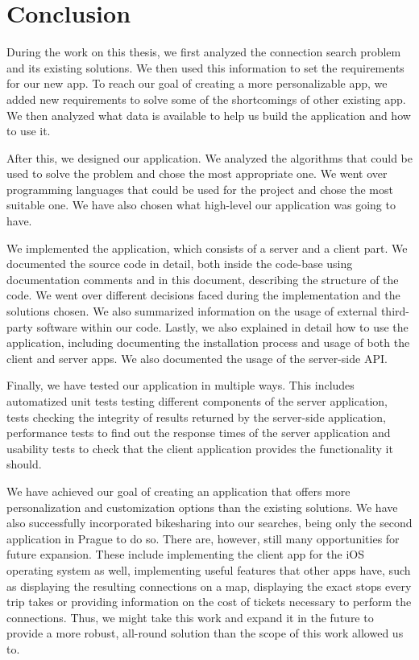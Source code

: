 \chapter*{Conclusion}

During the work on this thesis, we first analyzed the connection search problem and its existing solutions. We then used this information to set the requirements for our new app. To reach our goal of creating a more personalizable app, we added new requirements to solve some of the shortcomings of other existing app. We then analyzed what data is available to help us build the application and how to use it.

After this, we designed our application. We analyzed the algorithms that could be used to solve the problem and chose the most appropriate one. We went over programming languages that could be used for the project and chose the most suitable one. We have also chosen what high-level our application was going to have.

We implemented the application, which consists of a server and a client part. We documented the source code in detail, both inside the code-base using documentation comments and in this document, describing the structure of the code. We went over different decisions faced during the implementation and the solutions chosen. We also summarized information on the usage of external third-party software within our code. Lastly, we also explained in detail how to use the application, including documenting the installation process and usage of both the client and server apps. We also documented the usage of the server-side API.

Finally, we have tested our application in multiple ways. This includes automatized unit tests testing different components of the server application, tests checking the integrity of results returned by the server-side application, performance tests to find out the response times of the server application and usability tests to check that the client application provides the functionality it should.

We have achieved our goal of creating an application that offers more personalization and customization options than the existing solutions. We have also successfully incorporated bikesharing into our searches, being only the second application in Prague to do so. There are, however, still many opportunities for future expansion. These include implementing the client app for the iOS operating system as well, implementing useful features that other apps have, such as displaying the resulting connections on a map, displaying the exact stops every trip takes or providing information on the cost of tickets necessary to perform the connections. Thus, we might take this work and expand it in the future to provide a more robust, all-round solution than the scope of this work allowed us to.
